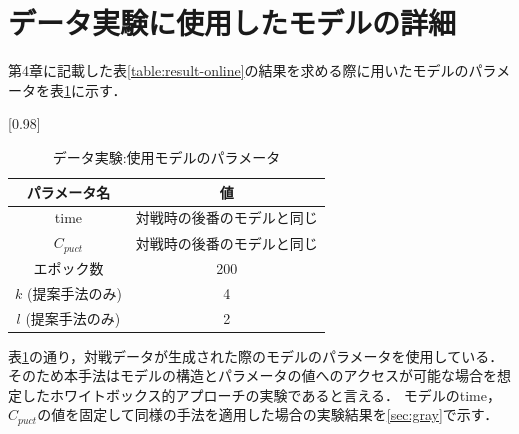 \section{データ実験に使用したモデルの詳細}
第4章に記載した表\ref{table:result-online}の結果を求める際に用いたモデルのパラメータを表\ref{table:param-data}に示す．
\begin{table}[H]
	\caption{データ実験:使用モデルのパラメータ}
	\centering
	\scalebox{0.98}[0.98]{
		\begin{tabular}{c|c}
			パラメータ名 & 値 \\ \hline
			time    & 対戦時の後番のモデルと同じ \\ 
			$C_{puct}$    & 対戦時の後番のモデルと同じ \\
			エポック数 & 200 \\
			$k$ (提案手法のみ)     & 4 \\
			$l$ (提案手法のみ)     & 2 \\
		\end{tabular}
	}
	\label{table:param-data}
\end{table}

表\ref{table:param-data}の通り，対戦データが生成された際のモデルのパラメータを使用している．
そのため本手法はモデルの構造とパラメータの値へのアクセスが可能な場合を想定したホワイトボックス的アプローチの実験であると言える．
モデルのtime， $C_{puct}$の値を固定して同様の手法を適用した場合の実験結果を\ref{sec:gray}で示す．
